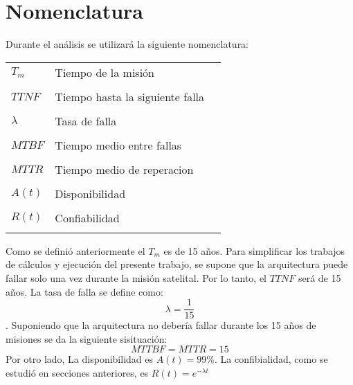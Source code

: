 \section{Nomenclatura}
Durante el análisis se utilizará la siguiente nomenclatura:

\begin{tabular}{p{3cm}l l }

$T_m$       & Tiempo de la misión\\ \\
$TTNF$      & Tiempo hasta la siguiente falla\\ \\
$\lambda$   & Tasa de falla\\ \\
$MTBF$      & Tiempo medio entre fallas\\ \\
$MTTR$      & Tiempo medio de reperacion\\ \\
$A(t)$      & Disponibilidad\\ \\
$R(t)$      & Confiabilidad\\ \\

\end{tabular}

Como se definió anteriormente el $T_m$ es de 15 años. Para simplificar los trabajos de cálculos y ejecución del presente trabajo, se supone que la arquitectura puede fallar solo una vez durante la misión satelital. Por lo tanto, el $TTNF$ será de 15 años. La tasa de falla se define como: $$\lambda = \frac{1}{15}$$. Suponiendo que la arquitectura no debería fallar durante los 15 años de misiones se da la siguiente sisituación: $$MTTBF = MTTR = 15 $$ Por otro lado, La disponibilidad es $A(t) = 99\%$. La confibialidad, como se estudió en secciones anteriores, es $R(t) = e^{- \lambda t}$


